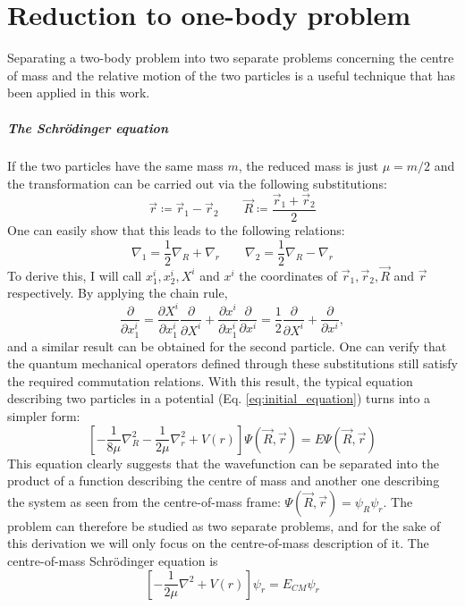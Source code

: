 \appendix
\chapter{Reduction to one-body problem}\label{appendix:onebody}
Separating a two-body problem into two separate problems concerning the centre of mass and the relative motion of the two particles is a useful technique that has been applied in this work.

\paragraph{The Schrödinger equation}
If the two particles have the same mass \(m\), the reduced mass is just \(\mu = m /2\) and the transformation can be carried out via the following substitutions:
\begin{equation}\label{eq:twobody_transform}
	\vec{r}\coloneqq \vec{r}_1 - \vec{r}_2 \qquad
	\vec{R} \coloneqq \frac{\vec{r}_1 + \vec{r}_2}{2}
\end{equation}
One can easily show that this leads to the following relations:
\begin{equation}
	\nabla _1 = \frac{1}{2} \nabla _R + \nabla _r
	\qquad
	\nabla _2 = \frac{1}{2} \nabla _R - \nabla _r
\end{equation}
To derive this, I will call \(x^i_1, x^i_2, X^i \) and \(x^i\) the coordinates of \(\vec{r}_1, \vec{r}_2, \vec{R} \) and \(\vec{r}\) respectively. By applying the chain rule,
\begin{equation}
	\frac{\partial }{\partial x^i_1} = \frac{\partial X^i}{\partial x^i_1} \frac{\partial }{\partial X^i} + \frac{\partial x^i}{\partial x^i_1} \frac{\partial }{\partial x^i} = \frac{1}{2} \frac{\partial }{\partial X^i} + \frac{\partial }{\partial x^i},
\end{equation}
and a similar result can be obtained for the second particle. One can verify that the quantum mechanical operators defined through these substitutions still satisfy the required commutation relations. With this result, the typical equation describing two particles in a potential (Eq. \eqref{eq:initial_equation}) turns into a simpler form:
\begin{equation}
	\left[- \frac{1}{8\mu} \nabla _R^{2} - \frac{1}{2\mu } \nabla _r^2 + V(r)\right] \Psi (\vec{R},\vec{r})= E \Psi (\vec{R},\vec{r})
\end{equation}
This equation clearly suggests that the wavefunction can be separated into the product of a function describing the centre of mass and another one describing the system as seen from the centre-of-mass frame: \(\Psi (\vec{R},\vec{r}) = \psi_R \psi _r\). The problem can therefore be studied as two separate problems, and for the sake of this derivation we will only focus on the centre-of-mass description of it. The centre-of-mass Schrödinger equation is
\begin{equation}
	\left[- \frac{1}{2\mu }\nabla^2 + V(r)\right]\psi _r = E_{CM} \psi _r
\end{equation}

